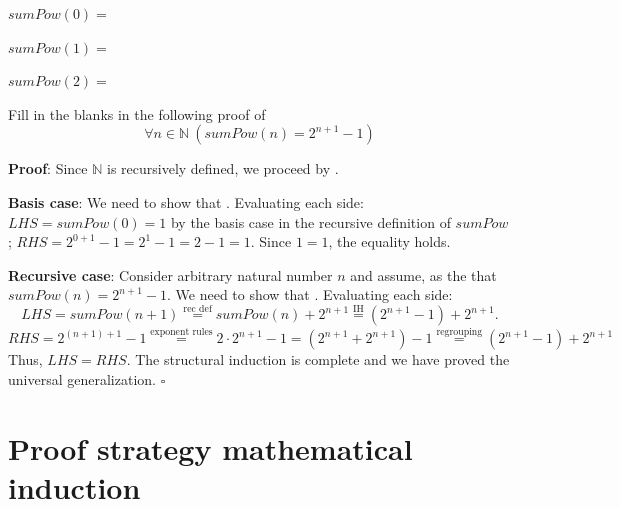 \documentclass[12pt, oneside]{article}
\begin{document}
$sumPow(0) =$

\vspace{20pt}

$sumPow(1) =$

\vspace{20pt}

$sumPow(2) =$

\vspace{20pt}


Fill in the blanks in the following proof of 
\[
    \forall n \in \mathbb{N}~(sumPow(n) = 2^{n+1} - 1)
\]

{\bf Proof}: Since $\mathbb{N}$ is recursively defined, we proceed by \underline{}.

{\bf Basis case}: We need to show that \underline{}.
Evaluating each side: $LHS = sumPow(0) = 1$ by the basis case in the recursive definition
of $sumPow$; $RHS = 2^{0+1} - 1 = 2^1 - 1 = 2-1 = 1$. Since $1=1$, the equality holds.

{\bf Recursive case}: Consider arbitrary natural number $n$ and assume, as the 
\underline{\phantom{Induction Hypothesis (IH)}} that $sumPow(n) = 2^{n+1} - 1$. We need to show that
\underline{}.  Evaluating each side: 
\[
LHS = sumPow(n+1) \overset{\text{rec def}}{=} sumPow(n)  + 2^{n+1}\overset{\text{IH}}{=} (2^{n+1} - 1) + 2^{n+1}.
\]
\[
RHS = 2^{(n+1)+1}- 1 \overset{\text{exponent rules}}{=} 2 \cdot 2^{n+1} -1  = \left(2^{n+1} + 2^{n+1} \right) - 1
\overset{\text{regrouping}}{=}  (2^{n+1} - 1) + 2^{n+1} 
\]
Thus, $LHS = RHS$. The structural induction is complete and we have proved the universal generalization.
$\square$

 \vfill
\section*{Proof strategy mathematical induction}


 \vfill
\end{document}
